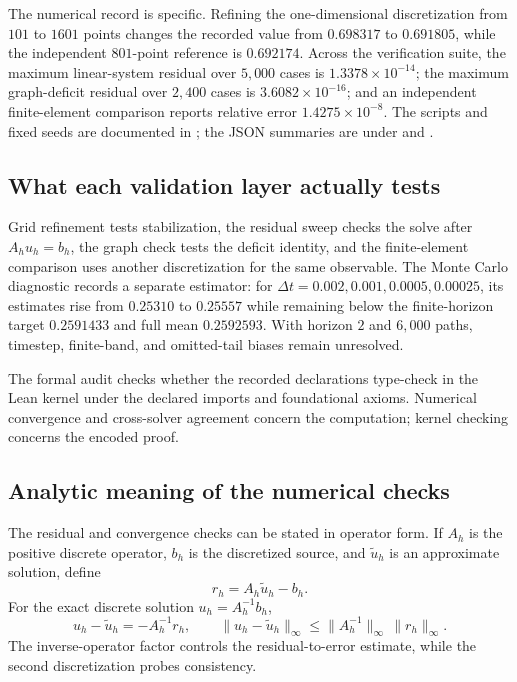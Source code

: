 \documentclass[10pt]{article}
\begin{document}
The numerical record is specific. Refining the one-dimensional discretization from $101$ to $1601$ points changes the recorded value from $0.698317$ to $0.691805$, while the independent $801$-point reference is $0.692174$. Across the verification suite, the maximum linear-system residual over $5{,}000$ cases is $1.3378\times10^{-14}$; the maximum graph-deficit residual over $2{,}400$ cases is $3.6082\times10^{-16}$; and an independent finite-element comparison reports relative error $1.4275\times10^{-8}$. The scripts and fixed seeds are documented in ; the JSON summaries are under  and .

\subsection{What each validation layer actually tests}

Grid refinement tests stabilization, the residual sweep checks the solve after $A_hu_h=b_h$, the graph check tests the deficit identity, and the finite-element comparison uses another discretization for the same observable. The Monte Carlo diagnostic records a separate estimator: for $\Delta t=0.002,0.001,0.0005,0.00025$, its estimates rise from $0.25310$ to $0.25557$ while remaining below the finite-horizon target $0.2591433$ and full mean $0.2592593$. With horizon $2$ and $6{,}000$ paths, timestep, finite-band, and omitted-tail biases remain unresolved.

\pagebreak
The formal audit checks whether the recorded declarations type-check in the Lean kernel under the declared imports and foundational axioms. Numerical convergence and cross-solver agreement concern the computation; kernel checking concerns the encoded proof.

\subsection{Analytic meaning of the numerical checks}

The residual and convergence checks can be stated in operator form. If $A_h$ is the positive discrete operator, $b_h$ is the discretized source, and $\widetilde u_h$ is an approximate solution, define
\[
r_h=A_h\widetilde u_h-b_h.
\]
For the exact discrete solution $u_h=A_h^{-1}b_h$,
\[
u_h-\widetilde u_h=-A_h^{-1}r_h,
\qquad
\lVert u_h-\widetilde u_h\rVert_\infty
\leq \lVert A_h^{-1}\rVert_\infty\,\lVert r_h\rVert_\infty.
\]
The inverse-operator factor controls the residual-to-error estimate, while the second discretization probes consistency.
\end{document}
